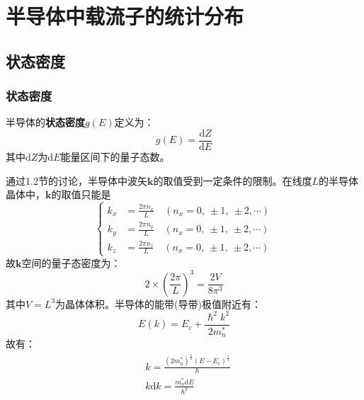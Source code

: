 \chapter{半导体中载流子的统计分布}

\section{状态密度}

\subsection{状态密度}

半导体的\textbf{状态密度}$g(E)$定义为：
\begin{equation}
    g(E)=\frac{\mathrm{d}Z}{\mathrm{d}E}\label{eq:chap-3-state-density}
\end{equation}
其中$\mathrm{d}Z$为$\mathrm{d}E$能量区间下的量子态数。

通过1.2节的讨论，半导体中波矢$\bm k$的取值受到一定条件的限制。在线度$L$的半导体晶体中，$\bm k$的取值只能是
\begin{equation}
\left\{
\begin{aligned}
    k_x&=\frac{2\pi n_x}{L}\quad (n_x=0,\ \pm 1,\ \pm 2,\cdots)\\
    k_y&=\frac{2\pi n_y}{L}\quad (n_x=0,\ \pm 1,\ \pm 2,\cdots)\\
    k_z&=\frac{2\pi n_z}{L}\quad (n_x=0,\ \pm 1,\ \pm 2,\cdots)
\end{aligned}
\right.
\end{equation}
故$\bm k$空间的量子态密度为：
\begin{equation}
    2\times\left(\frac{2\pi}{L}\right)^3=\frac{2V}{8\pi^3}
\end{equation}
其中$V=L^3$为晶体体积。半导体的能带(导带)极值附近有：
\begin{equation}
    E(k)=E_c+\frac{\hslash^2k^2}{2m_n^*}
\end{equation}
故有：
\begin{align}
    &k=\frac{\left(2m_n^*\right)^\frac{1}{2}\left(E-E_c\right)^\frac{1}{2}}{\hslash}\label{eq:chap-3-energy-band-k(E)}\\
    &k\mathrm{d}k=\frac{m_n^*\mathrm{d}E}{\hslash^2}\label{eq:chap-3-energy-band-kdk(E)}
\end{align}

